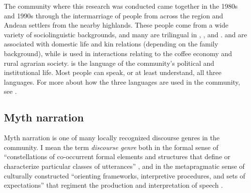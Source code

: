 \documentclass[output=paper]{LSP/langsci}
\begin{document}
The community where this research was conducted came together in the 1980s and 1990s through the intermarriage of  people from across the region and Andean settlers from the nearby highlands. These people come from a wide variety of sociolinguistic backgrounds, and many are trilingual in , , and .  and  are associated with domestic life and kin relations (depending on the family background), while  is used in interactions relating to the coffee economy and rural agrarian society.  is the language of the community’s political and institutional life. Most people can speak, or at least understand, all three languages. For more about how the three languages are used in the community, see \citet{emlen14,emlen.2015, emlen.2017}.\largerpage
 
\subsection{Myth narration}
\label{Emmyth-narr}
Myth narration is one of many locally recognized discourse genres in the community. I mean the term \textit{discourse genre} both in the formal sense of ``constellations of co-occurrent formal elements and structures that define or characterize particular classes of utterances''  \citep[][141]{briggs.1992}, and in the metapragmatic sense of culturally constructed ``orienting frameworks, interpretive procedures, and sets of expectations'' \citep[][670]{hanks.1987} that regiment the production and interpretation of speech  \citep[see also][]{bakhtin86,silverstein93}.  
\end{document}

